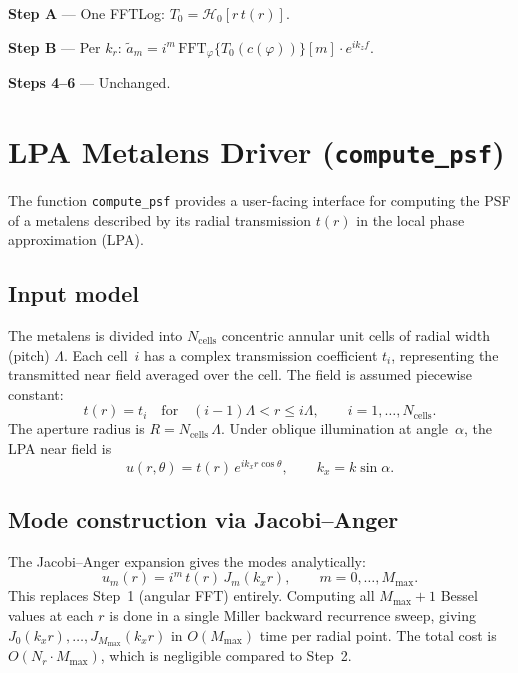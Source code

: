 \documentclass[11pt,a4paper]{article}
\newcommand{\HT}{\mathcal{H}}
\begin{document}
\begin{tcolorbox}[title=CyFFP: Neumann Fast Path (LPA/scalar)]
\textbf{Step A} --- One FFTLog: $T_0 = \HT_0[r\,t(r)]$.

\textbf{Step B} --- Per $k_r$: $\tilde a_m = i^m\,\mathrm{FFT}_\varphi\{T_0(c(\varphi))\}[m]\cdot e^{ik_z f}$.

\textbf{Steps 4--6} --- Unchanged.
\end{tcolorbox}


\section{LPA Metalens Driver (\texttt{compute\_psf})}
\label{sec:compute_psf}

The function \texttt{compute\_psf} provides a user-facing interface for
computing the PSF of a metalens described by its radial transmission
$t(r)$ in the local phase approximation (LPA).

\subsection{Input model}

The metalens is divided into $N_{\mathrm{cells}}$ concentric annular unit cells
of radial width (pitch) $\Lambda$.  Each cell~$i$ has a complex transmission
coefficient $t_i$, representing the transmitted near field averaged over the
cell.  The field is assumed piecewise constant:
\begin{equation}
  t(r) = t_i \quad\text{for}\quad (i{-}1)\Lambda < r \le i\Lambda,
  \qquad i = 1,\ldots,N_{\mathrm{cells}}.
\end{equation}
The aperture radius is $R = N_{\mathrm{cells}}\,\Lambda$.
Under oblique illumination at angle~$\alpha$, the LPA near field is
\begin{equation}
  u(r,\theta) = t(r)\,e^{ik_x r\cos\theta},
  \qquad k_x = k\sin\alpha.
\end{equation}

\subsection{Mode construction via Jacobi--Anger}

The Jacobi--Anger expansion gives the modes analytically:
\begin{equation}\label{eq:um_jacobi}
  u_m(r) = i^m\,t(r)\,J_m(k_x r),
  \qquad m = 0,\ldots,M_{\max}.
\end{equation}
This replaces Step~1 (angular FFT) entirely.  Computing all $M_{\max}+1$
Bessel values at each $r$ is done in a single Miller backward recurrence
sweep, giving $J_0(k_x r),\ldots,J_{M_{\max}}(k_x r)$ in $O(M_{\max})$
time per radial point.  The total cost is $O(N_r \cdot M_{\max})$, which
is negligible compared to Step~2.
\end{document}
